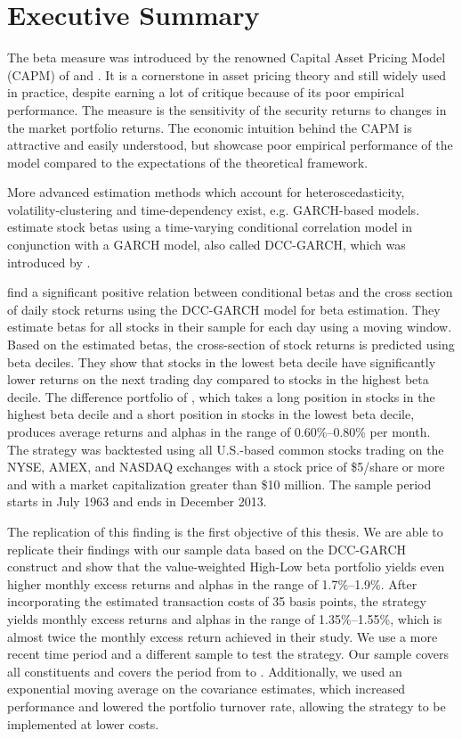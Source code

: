 \section*{Executive Summary}

\begin{doublespacing}

The beta measure was introduced by the renowned Capital Asset Pricing Model (CAPM) of  and . It is a cornerstone in asset pricing theory and still widely used in practice, despite earning a lot of critique because of its poor empirical performance. The measure is the sensitivity of the security returns to changes in the market portfolio returns. The economic intuition behind the CAPM is attractive and easily understood, but  showcase poor empirical performance of the model compared to the expectations of the theoretical framework.

More advanced estimation methods which account for heteroscedasticity, volatility-clustering and time-dependency exist, e.g. GARCH-based models.  estimate stock betas using a time-varying conditional correlation model in conjunction with a GARCH model, also called DCC-GARCH, which was introduced by .

 find a significant positive relation between conditional betas and the cross section of daily stock returns using the DCC-GARCH model for beta estimation. They estimate betas for all stocks in their sample for each day using a moving window. Based on the estimated betas, the cross-section of stock returns is predicted using beta deciles. They show that stocks in the lowest beta decile have significantly lower returns on the next trading day compared to stocks in the highest beta decile. The difference portfolio of , which takes a long position in stocks in the highest beta decile and a short position in stocks in the lowest beta decile, produces average returns and alphas in the range of 0.60\%–0.80\% per month. The strategy was backtested using all U.S.-based common stocks trading on the NYSE, AMEX, and NASDAQ exchanges with a stock price of \$5/share or more and with a market capitalization greater than \$10 million. The sample period starts in July 1963 and ends in December 2013.

The replication of this finding is the first objective of this thesis. We are able to replicate their findings with our sample data based on the DCC-GARCH construct and show that the value-weighted High-Low beta portfolio yields even higher monthly excess returns and alphas in the range of 1.7\%–1.9\%. After incorporating the estimated transaction costs of 35 basis points, the strategy yields monthly excess returns and alphas in the range of 1.35\%–1.55\%, which is almost twice the monthly excess return  achieved in their study. We use a more recent time period and a different sample to test the strategy. Our sample covers all \indexName{} constituents and covers the period from \periodFrom{} to \periodTo{}. Additionally, we used an exponential moving average on the covariance estimates, which increased performance and lowered the portfolio turnover rate, allowing the strategy to be implemented at lower costs.


\end{doublespacing}
